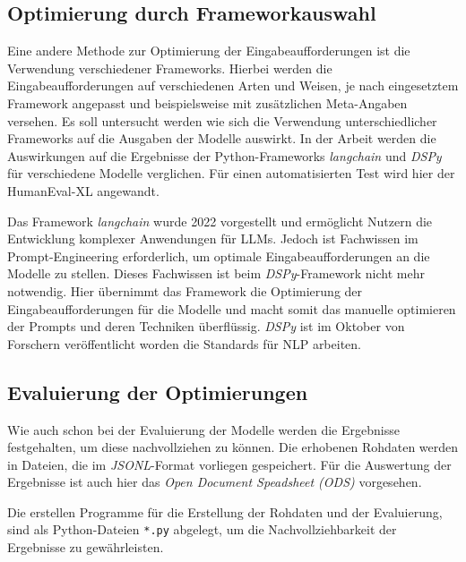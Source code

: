 \subsection{Optimierung durch Frameworkauswahl}
Eine andere Methode zur Optimierung der Eingabeaufforderungen ist die Verwendung verschiedener Frameworks. Hierbei werden die Eingabeaufforderungen auf verschiedenen Arten und Weisen, je nach eingesetztem Framework angepasst und beispielsweise mit zusätzlichen Meta-Angaben versehen. Es soll untersucht werden wie sich die Verwendung unterschiedlicher Frameworks auf die Ausgaben der Modelle auswirkt. In der Arbeit werden die Auswirkungen auf die Ergebnisse der Python-Frameworks \textit{langchain} und \textit{DSPy} für verschiedene Modelle verglichen. Für einen automatisierten Test wird hier der HumanEval-XL angewandt.\vspace{0.2cm}

Das Framework \textit{langchain} wurde 2022 vorgestellt und ermöglicht Nutzern die Entwicklung komplexer Anwendungen für LLMs. Jedoch ist Fachwissen im Prompt-Engineering erforderlich, um optimale Eingabeaufforderungen an die Modelle zu stellen. Dieses Fachwissen ist beim \textit{DSPy}-Framework nicht mehr notwendig. Hier übernimmt das Framework die Optimierung der Eingabeaufforderungen für die Modelle und macht somit das manuelle optimieren der Prompts und deren Techniken überflüssig. \textit{DSPy} ist im Oktober von Forschern veröffentlicht worden die Standards für NLP arbeiten.\vspace{0.2cm}


\subsection{Evaluierung der Optimierungen}
Wie auch schon bei der Evaluierung der Modelle werden die Ergebnisse festgehalten, um diese nachvollziehen zu können. Die erhobenen Rohdaten werden in Dateien, die im \textit{JSONL}-Format vorliegen gespeichert. Für die Auswertung der Ergebnisse ist auch hier das \textit{Open Document Speadsheet (ODS)} vorgesehen.\vspace{0.2cm}

Die erstellen Programme für die Erstellung der Rohdaten und der Evaluierung, sind als Python-Dateien \texttt{*.py} abgelegt, um die Nachvollziehbarkeit der Ergebnisse zu gewährleisten.

